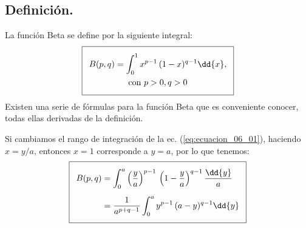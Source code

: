 \subsection{Definición.}
La función Beta se define por la siguiente integral:
\begin{align} \addtolength{\fboxsep}{5pt}\boxed{
\begin{gathered}
B(p, q) = \int_{0}^{1} x^{p-1} \, (1- x )^{q-1} \dd{x}, \\
\mbox{con }  p > 0, q > 0
\end{gathered}}
\label{eq:ecuacion_06_01}
\end{align}
Existen una serie de fórmulas para la función Beta que es conveniente conocer, todas ellas derivadas de la definición.
\par
Si cambiamos el rango de integración de la ec. (\ref{eq:ecuacion_06_01}), haciendo $x = y/a$, entonces $x = 1$ corresponde a $y = a$, por lo que tenemos:
\begin{align} \addtolength{\fboxsep}{5pt}\boxed{
\begin{aligned}
B (p, q) &= \int_{0}^{a} \left( \dfrac{y}{a}\right)^{p-1} \, \left( 1 - \dfrac{y}{a}\right)^{q-1} \dfrac{\dd{y}}{a} \\[0.5em]
&= \dfrac{1}{a^{p+q-1}} \int_{0}^{a} y^{p-1} \, (a - y)^{q-1} \dd{y}
\end{aligned}
\label{eq:ecuacion_06_03}
}
\end{align}
